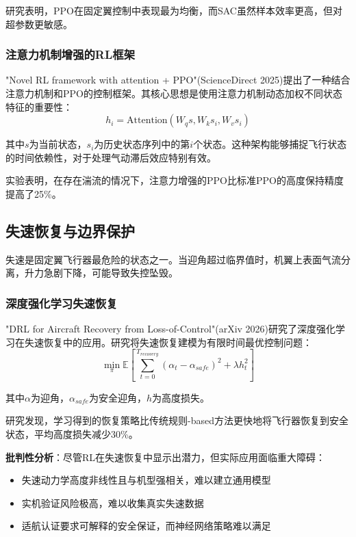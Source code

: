\documentclass[12pt,a4paper]{ctexart}
\begin{document}
研究表明，PPO在固定翼控制中表现最为均衡，而SAC虽然样本效率更高，但对超参数更敏感。

\subsubsection{注意力机制增强的RL框架}

"Novel RL framework with attention + PPO"(ScienceDirect 2025)提出了一种结合注意力机制和PPO的控制框架。其核心思想是使用注意力机制动态加权不同状态特征的重要性：
\begin{equation}
    h_i = \text{Attention}(W_q s, W_k s_i, W_v s_i)
\end{equation}

其中$s$为当前状态，$s_i$为历史状态序列中的第$i$个状态。这种架构能够捕捉飞行状态的时间依赖性，对于处理气动滞后效应特别有效。

实验表明，在存在湍流的情况下，注意力增强的PPO比标准PPO的高度保持精度提高了25\%。

\subsection{失速恢复与边界保护}

失速是固定翼飞行器最危险的状态之一。当迎角超过临界值时，机翼上表面气流分离，升力急剧下降，可能导致失控坠毁。

\subsubsection{深度强化学习失速恢复}

"DRL for Aircraft Recovery from Loss-of-Control"(arXiv 2026)研究了深度强化学习在失速恢复中的应用。研究将失速恢复建模为有限时间最优控制问题：
\begin{equation}
    \min_{\pi} \mathbb{E}\left[\sum_{t=0}^{T_{recovery}} (\alpha_t - \alpha_{safe})^2 + \lambda h_t^2\right]
\end{equation}

其中$\alpha$为迎角，$\alpha_{safe}$为安全迎角，$h$为高度损失。

研究发现，学习得到的恢复策略比传统规则-based方法更快地将飞行器恢复到安全状态，平均高度损失减少30\%。

\textbf{批判性分析}：尽管RL在失速恢复中显示出潜力，但实际应用面临重大障碍：
\begin{itemize}
    \item 失速动力学高度非线性且与机型强相关，难以建立通用模型
    \item 实机验证风险极高，难以收集真实失速数据
    \item 适航认证要求可解释的安全保证，而神经网络策略难以满足
\end{itemize}
\end{document}
